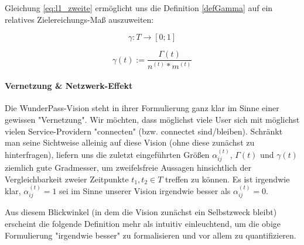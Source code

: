 \vspace{0.3cm}

Gleichung \eqref{eq:l1_zweite} ermöglicht uns die Definition \ref{defGamma} auf ein relatives Zielereichungs-Maß auszuweiten:

\vspace{0.3cm}

\begin{Def}\label{defKleinGamma}
\begin{equation*}
  \gamma : T \rightarrow [0; 1] 
\end{equation*}

\begin{equation*}
  \gamma(t):= \frac{\Gamma(t)}{n^{(t)} * m^{(t)}}
\end{equation*}

\end{Def}

\paragraph{Vernetzung \& Netzwerk-Effekt}
\label{sec:zahlen_status_quo_netzwerk_effekt}

\textrm{ }
\vspace{0.3cm}

Die WunderPass-Vision steht in ihrer Formulierung ganz klar im Sinne einer gewissen "Vernetzung". Wir möchten, dass möglichst viele User sich mit möglichst vielen Service-Providern "connecten" (bzw. connectet sind/bleiben). Schränkt man seine Sichtweise alleinig auf diese Vision (ohne diese zunächst zu hinterfragen), liefern uns die zuletzt eingeführten Größen $\alpha^{(t)}_{ij}$, $\Gamma(t)$ und $\gamma(t)$ ziemlich gute Gradmesser, um zweifelsfreie Aussagen hinsichtlich der Vergleichbarkeit zweier Zeitpunkte $t_1, t_2 \in T$ treffen zu können. Es ist irgendwie klar, $\alpha^{(t)}_{ij} = 1$ sei im Sinne unserer Vision irgendwie besser als $\alpha^{(t)}_{ij} = 0$.

Aus diesem Blickwinkel (in dem die Vision zunächst ein Selbstzweck bleibt) erscheint die folgende Definition mehr als intuitiv einleuchtend, um die obige Formulierung "irgendwie besser" zu formalisieren und vor allem zu quantifizieren. 

\vspace{0.3cm}

